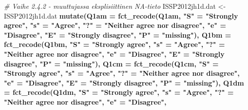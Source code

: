 \documentclass[
  finnish,
]{book}
\newenvironment{Shaded}{\begin{snugshade}}{\end{snugshade}}
\newcommand{\CommentTok}[1]{\textcolor[rgb]{0.56,0.35,0.01}{\textit{#1}}}
\newcommand{\DataTypeTok}[1]{\textcolor[rgb]{0.13,0.29,0.53}{#1}}
\newcommand{\KeywordTok}[1]{\textcolor[rgb]{0.13,0.29,0.53}{\textbf{#1}}}
\newcommand{\NormalTok}[1]{#1}
\newcommand{\OperatorTok}[1]{\textcolor[rgb]{0.81,0.36,0.00}{\textbf{#1}}}
\newcommand{\StringTok}[1]{\textcolor[rgb]{0.31,0.60,0.02}{#1}}
\begin{document}
\begin{Shaded}
\begin{Highlighting}[]
{{{{{{{{{{{{{{{{{{{{{{{{{{{{{{{{{{{{{{{{{{{{{{{{{{{{{{{{{{{{{{{{{{{{{{{{{{{{{{{{{{{{{{{{{{{{{{{{{{{{{{{{{\CommentTok{# Vaihe 2.4.2 - muuttujassa eksplisiittinen NA-tieto}
\NormalTok{ISSP2012jh1d.dat <-}\StringTok{ }\NormalTok{ISSP2012jh1d.dat }\OperatorTok{%
\StringTok{    }\KeywordTok{mutate}\NormalTok{(}\DataTypeTok{Q1am =} \KeywordTok{fct_recode}\NormalTok{(Q1am,}
                            \StringTok{"S"}\NormalTok{ =}\StringTok{ "Strongly agree"}\NormalTok{,}
                            \StringTok{"s"}\NormalTok{ =}\StringTok{ "Agree"}\NormalTok{,}
                            \StringTok{"?"}\NormalTok{ =}\StringTok{ "Neither agree nor disagree"}\NormalTok{,}
                            \StringTok{"e"}\NormalTok{ =}\StringTok{ "Disagree"}\NormalTok{,}
                            \StringTok{"E"}\NormalTok{ =}\StringTok{ "Strongly disagree"}\NormalTok{,}
                            \StringTok{"P"}\NormalTok{ =}\StringTok{ "missing"}\NormalTok{),}
           \DataTypeTok{Q1bm =} \KeywordTok{fct_recode}\NormalTok{(Q1bm,}
                           \StringTok{"S"}\NormalTok{ =}\StringTok{ "Strongly agree"}\NormalTok{,}
                           \StringTok{"s"}\NormalTok{ =}\StringTok{ "Agree"}\NormalTok{,}
                           \StringTok{"?"}\NormalTok{ =}\StringTok{ "Neither agree nor disagree"}\NormalTok{,}
                           \StringTok{"e"}\NormalTok{ =}\StringTok{ "Disagree"}\NormalTok{,}
                           \StringTok{"E"}\NormalTok{ =}\StringTok{ "Strongly disagree"}\NormalTok{,}
                           \StringTok{"P"}\NormalTok{ =}\StringTok{ "missing"}\NormalTok{),}
           \DataTypeTok{Q1cm =} \KeywordTok{fct_recode}\NormalTok{(Q1cm,}
                           \StringTok{"S"}\NormalTok{ =}\StringTok{ "Strongly agree"}\NormalTok{,}
                           \StringTok{"s"}\NormalTok{ =}\StringTok{ "Agree"}\NormalTok{,}
                           \StringTok{"?"}\NormalTok{ =}\StringTok{ "Neither agree nor disagree"}\NormalTok{,}
                           \StringTok{"e"}\NormalTok{ =}\StringTok{ "Disagree"}\NormalTok{,}
                           \StringTok{"E"}\NormalTok{ =}\StringTok{ "Strongly disagree"}\NormalTok{,}
                           \StringTok{"P"}\NormalTok{ =}\StringTok{ "missing"}\NormalTok{),}
           \DataTypeTok{Q1dm =} \KeywordTok{fct_recode}\NormalTok{(Q1dm,}
                           \StringTok{"S"}\NormalTok{ =}\StringTok{ "Strongly agree"}\NormalTok{,}
                           \StringTok{"s"}\NormalTok{ =}\StringTok{ "Agree"}\NormalTok{,}
                           \StringTok{"?"}\NormalTok{ =}\StringTok{ "Neither agree nor disagree"}\NormalTok{,}
                           \StringTok{"e"}\NormalTok{ =}\StringTok{ "Disagree"}\NormalTok{,}
}}}}}}}}}}}}}}}}}}}}}}}}}}}}}}}}}}}}}}}}}}}}}}}}}}}}}}}}}}}}}}}}}}}}}}}}}}}}}}}}}}}}}}}}}}}}}}}}}}}}}}}}}}
\end{Highlighting}
\end{Shaded}
\end{document}
